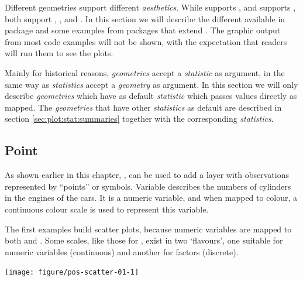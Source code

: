 \documentclass[krantz2]{krantz}\usepackage{knitr}%
\begin{document}
Different geometries support different \emph{aesthetics}. While  supports , and  supports , both support , ,  and . In this section we will describe the different  available in package \ggplot and some examples from packages that extend \ggplot. The graphic output from most code examples will not be shown, with the expectation that readers will run them to see the plots.

Mainly for historical reasons, \emph{geometries} accept a \emph{statistic} as argument, in the same way as \emph{statistics} accept a \emph{geometry} as argument. In this section we will only describe \emph{geometries} which have as default \emph{statistic}  which passes values directly as mapped. The \emph{geometries} that have other \emph{statistics} as default are described in section \ref{sec:plot:stat:summaries} together with the corresponding \emph{statistics}.

\subsection{Point}\label{sec:plot:geom:point}

As shown earlier in this chapter, , can be used to add a layer with observations represented by ``points'' or symbols. Variable  describes the numbers of cylinders in the engines of the cars. It is a numeric variable, and when mapped to colour, a continuous colour scale is used to represent this variable.

The first examples build scatter plots, because numeric variables are mapped to both  and .
Some scales, like those for , exist in two `flavours', one suitable for numeric variables (continuous) and another for factors (discrete).

\begin{knitrout}\footnotesize
{}\color{fgcolor}\begin{kframe}
\begin{alltt}
\hlstd{(} 
       \hlstd{(}      \hlopt{+}
  \hlstd{()}
\end{alltt}
\end{kframe}

{\centering \texttt{[image: figure/pos-scatter-01-1]} 

}



\end{knitrout}
\end{document}

